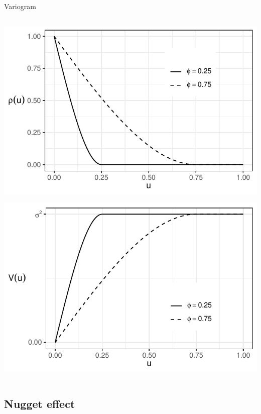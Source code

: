 \documentclass[
  ignorenonframetext,
]{beamer}
\begin{document}
\begin{frame}{Variogram}
\begin{columns}[T]
\begin{column}{0.48\textwidth}
\includegraphics{Lecture_1_files/figure-beamer/unnamed-chunk-49-1.pdf}

\includegraphics{Lecture_1_files/figure-beamer/unnamed-chunk-50-1.pdf}
\end{column}
\end{columns}
\end{frame}

\hypertarget{nugget-effect}{%
\subsection{Nugget effect}\label{nugget-effect}}
\end{document}
